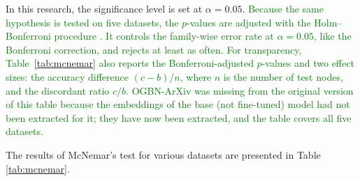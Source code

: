 \documentclass[a4paper,fleqn]{cas-sc}
\newcommand{\revthree}[1]{\textcolor{green}{#1}} %
\begin{document}
In this research, the significance level is set at \(\alpha = 0.05\).
\revthree{Because the same hypothesis is tested on five datasets, the $p$-values are adjusted with the Holm--Bonferroni procedure \citep{holm1979simple}. It controls the family-wise error rate at $\alpha=0.05$, like the Bonferroni correction, and rejects at least as often. For transparency, Table~\ref{tab:mcnemar} also reports the Bonferroni-adjusted $p$-values and two effect sizes: the accuracy difference $(c-b)/n$, where $n$ is the number of test nodes, and the discordant ratio $c/b$. OGBN-ArXiv was missing from the original version of this table because the embeddings of the base (not fine-tuned) model had not been extracted for it; they have now been extracted, and the table covers all five datasets.}

The results of McNemar's test for various datasets are presented in Table \ref{tab:mcnemar}.
\end{document}

